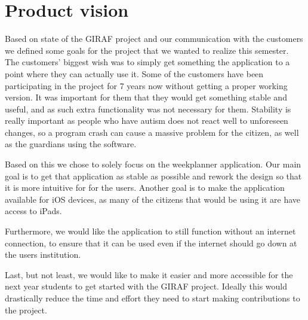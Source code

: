\section{Product vision}
Based on state of the GIRAF project and our communication with the customers we defined some goals for the project that we wanted to realize this semester.
The customers' biggest wish was to simply get something the application to a point where they can actually use it.
Some of the customers have been participating in the project for 7 years now without getting a proper working version.
It was important for them that they would get something stable and useful, and as such extra functionality was not necessary for them.
Stability is really important as people who have autism does not react well to unforeseen changes, so a program crash can cause a massive problem for the citizen, as well as the guardians using the software.

Based on this we chose to solely focus on the weekplanner application.
Our main goal is to get that application as stable as possible and rework the design so that it is more intuitive for for the users.
Another goal is to make the application available for iOS devices, as many of the citizens that would be using it are have access to iPads.

Furthermore, we would like the application to still function without an internet connection, to ensure that it can be used even if the internet should go down at the users institution.

Last, but not least, we would like to make it easier and more accessible for the next year students to get started with the GIRAF project.
Ideally this would drastically reduce the time and effort they need to start making contributions to the project.